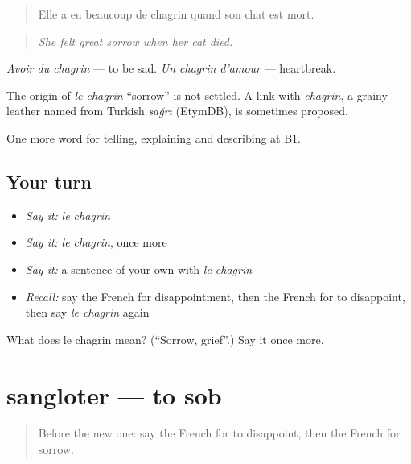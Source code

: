 \begin{quote}
Elle a eu beaucoup de chagrin quand son chat est mort.
\end{quote}

\begin{quote}
\emph{She felt great sorrow when her cat died.}
\end{quote}

\emph{Avoir du chagrin} — to be sad. \emph{Un chagrin d'amour} — heartbreak.

\begin{cousinweb}
The origin of \emph{le chagrin} \textquotedblleft{}sorrow\textquotedblright{} is not settled. A link with \emph{chagrin}, a grainy leather named from Turkish \emph{sağrı} (EtymDB), is sometimes proposed.
\end{cousinweb}

\begin{grammarlens}[title={What you've built}]
One more word for telling, explaining and describing at B1.
\end{grammarlens}

\subsection*{Your turn}
\begin{itemize}
\raggedright
  \item \emph{Say it:} \emph{le chagrin}
  \item \emph{Say it:} \emph{le chagrin}, once more
  \item \emph{Say it:} a sentence of your own with \emph{le chagrin}
  \item \emph{Recall:} say the French for disappointment, then the French for to disappoint, then say \emph{le chagrin} again
\end{itemize}

\begin{tcolorbox}[breakable,colback=teal!4,colframe=teal!35!black,title={Before you move on}]
What does le chagrin mean? (\textquotedblleft{}Sorrow, grief\textquotedblright{}.) Say it once more.
\end{tcolorbox}
\section[sangloter]{sangloter — to sob}

\label{lesson:FR-C471-sangloter}



\begin{quote}
Before the new one: say the French for to disappoint, then the French for sorrow.
\end{quote}

